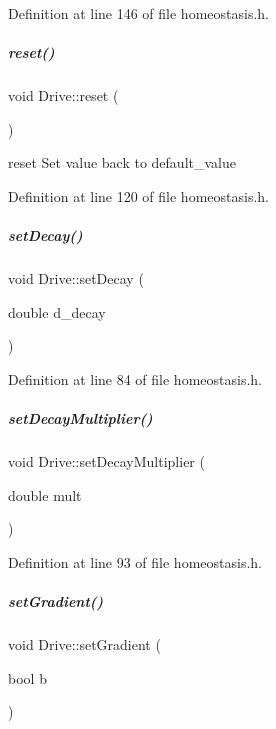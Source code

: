 Definition at line 146 of file homeostasis.\+h.

\mbox{\label{group__homeostasis_ad8a2a663703ad5eb93716b6917e2d68d}} 
\subparagraph{\texorpdfstring{reset()}{reset()}}
{\footnotesize\ttfamily void Drive\+::reset (\begin{DoxyParamCaption}{ }\end{DoxyParamCaption})\hspace{0.3cm}{\ttfamily [inline]}}



reset Set value back to default\+\_\+value 



Definition at line 120 of file homeostasis.\+h.

\mbox{\label{group__homeostasis_a1de29c1d81c42d9c5b9a982524df6f6a}} 
\subparagraph{\texorpdfstring{set\+Decay()}{setDecay()}}
{\footnotesize\ttfamily void Drive\+::set\+Decay (\begin{DoxyParamCaption}\item[{double}]{d\+\_\+decay }\end{DoxyParamCaption})\hspace{0.3cm}{\ttfamily [inline]}}



Definition at line 84 of file homeostasis.\+h.

\mbox{\label{group__homeostasis_a7ae347b4d2b03d714fbfdbcc99a84b66}} 
\subparagraph{\texorpdfstring{set\+Decay\+Multiplier()}{setDecayMultiplier()}}
{\footnotesize\ttfamily void Drive\+::set\+Decay\+Multiplier (\begin{DoxyParamCaption}\item[{double}]{mult }\end{DoxyParamCaption})\hspace{0.3cm}{\ttfamily [inline]}}



Definition at line 93 of file homeostasis.\+h.

\mbox{\label{group__homeostasis_a63aa9044b470ef1d942edeab621b9019}} 
\subparagraph{\texorpdfstring{set\+Gradient()}{setGradient()}}
{\footnotesize\ttfamily void Drive\+::set\+Gradient (\begin{DoxyParamCaption}\item[{bool}]{b }\end{DoxyParamCaption})\hspace{0.3cm}{\ttfamily [inline]}}



